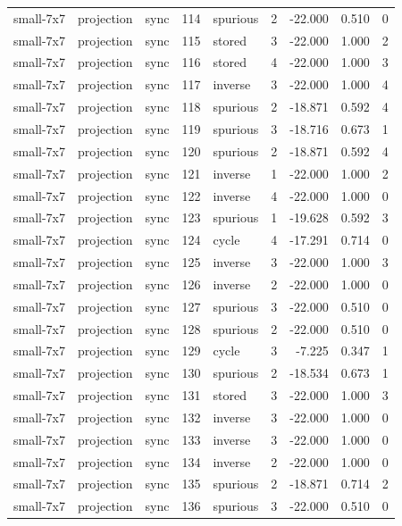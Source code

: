 \begin{tabular}{lllrlrrrr}
small-7x7 & projection & sync & 114 & spurious & 2 & -22.000 & 0.510 & 0 \\
small-7x7 & projection & sync & 115 & stored & 3 & -22.000 & 1.000 & 2 \\
small-7x7 & projection & sync & 116 & stored & 4 & -22.000 & 1.000 & 3 \\
small-7x7 & projection & sync & 117 & inverse & 3 & -22.000 & 1.000 & 4 \\
small-7x7 & projection & sync & 118 & spurious & 2 & -18.871 & 0.592 & 4 \\
small-7x7 & projection & sync & 119 & spurious & 3 & -18.716 & 0.673 & 1 \\
small-7x7 & projection & sync & 120 & spurious & 2 & -18.871 & 0.592 & 4 \\
small-7x7 & projection & sync & 121 & inverse & 1 & -22.000 & 1.000 & 2 \\
small-7x7 & projection & sync & 122 & inverse & 4 & -22.000 & 1.000 & 0 \\
small-7x7 & projection & sync & 123 & spurious & 1 & -19.628 & 0.592 & 3 \\
small-7x7 & projection & sync & 124 & cycle & 4 & -17.291 & 0.714 & 0 \\
small-7x7 & projection & sync & 125 & inverse & 3 & -22.000 & 1.000 & 3 \\
small-7x7 & projection & sync & 126 & inverse & 2 & -22.000 & 1.000 & 0 \\
small-7x7 & projection & sync & 127 & spurious & 3 & -22.000 & 0.510 & 0 \\
small-7x7 & projection & sync & 128 & spurious & 2 & -22.000 & 0.510 & 0 \\
small-7x7 & projection & sync & 129 & cycle & 3 & -7.225 & 0.347 & 1 \\
small-7x7 & projection & sync & 130 & spurious & 2 & -18.534 & 0.673 & 1 \\
small-7x7 & projection & sync & 131 & stored & 3 & -22.000 & 1.000 & 3 \\
small-7x7 & projection & sync & 132 & inverse & 3 & -22.000 & 1.000 & 0 \\
small-7x7 & projection & sync & 133 & inverse & 3 & -22.000 & 1.000 & 0 \\
small-7x7 & projection & sync & 134 & inverse & 2 & -22.000 & 1.000 & 0 \\
small-7x7 & projection & sync & 135 & spurious & 2 & -18.871 & 0.714 & 2 \\
small-7x7 & projection & sync & 136 & spurious & 3 & -22.000 & 0.510 & 0 \\

\end{tabular}
